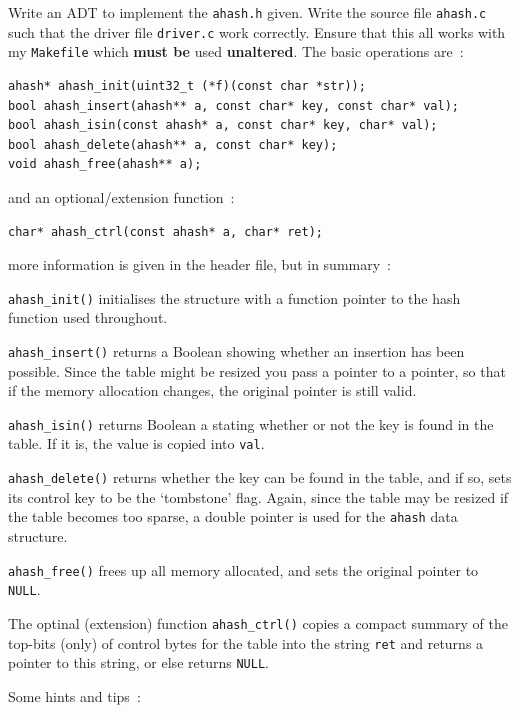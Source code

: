 \begin{exercise}
Write an ADT to implement the \verb^ahash.h^ given.  Write the
source file \verb^ahash.c^ such that
the driver file \verb^driver.c^
work correctly.  Ensure that this all works with my \verb^Makefile^
which {\bf must be} used {\bf unaltered}.  The basic operations are~:
\begin{verbatim}
ahash* ahash_init(uint32_t (*f)(const char *str));
bool ahash_insert(ahash** a, const char* key, const char* val);
bool ahash_isin(const ahash* a, const char* key, char* val);
bool ahash_delete(ahash** a, const char* key);
void ahash_free(ahash** a);
\end{verbatim}

\noindent
and an optional/extension function~:
\begin{verbatim}
char* ahash_ctrl(const ahash* a, char* ret);
\end{verbatim}

\noindent more information is given in the header file, but in summary~:

\noindent \verb^ahash_init()^ initialises the structure
with a function pointer to the hash function used throughout.

\noindent \verb^ahash_insert()^ returns a Boolean showing whether
an insertion has been possible. Since the table might be resized you
pass a pointer to a pointer, so that if the memory allocation changes,
the original pointer is still valid.

\noindent \verb^ahash_isin()^ returns Boolean a stating whether or not the
key is found in the table. If it is, the value is copied into \verb^val^.

\noindent \verb^ahash_delete()^ returns whether the key can be found in the table,
and if so, sets its control key to be the `tombstone' flag. Again,
since the table may be resized if the table becomes too sparse, a double
pointer is used for the \verb^ahash^ data structure.

\noindent \verb^ahash_free()^ frees up all memory allocated, and sets
the original pointer to \verb^NULL^.

\noindent
The optinal (extension) function \verb^ahash_ctrl()^ copies a compact
summary of the top-bits (only) of control bytes for the table into the
string \verb^ret^ and returns a pointer to this string, or else returns
\verb^NULL^.

Some hints and tips~:

\begin{itemize}


\end{itemize}
\end{exercise}
